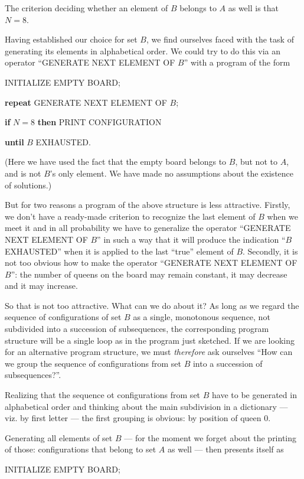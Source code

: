 The criterion deciding whether an element of $B$ belongs to $A$ as well is that $N = 8$.

Having established our choice for set $B$, we find ourselves faced with the task of generating its elements in alphabetical order. We could try to do this via an operator ``GENERATE NEXT ELEMENT OF $B$'' with a program of the form

INITIALIZE EMPTY BOARD;

\textbf{\textbf{repeat}} GENERATE NEXT ELEMENT OF $B$;

\quad \textbf{if} $N = 8$ \textbf{then} PRINT CONFIGURATION

\textbf{until} $B$ EXHAUSTED.

\noindent
(Here we have used the fact that the empty board belongs to $B$, but not to $A$, and is not $B$'s only element. We have made no assumptions about the existence of solutions.)

But for two reasons a program of the above structure is less attractive. Firstly, we don't have a ready-made criterion to recognize the last element of $B$ when we meet it and in all probability we have to generalize the operator ``GENERATE NEXT ELEMENT OF $B$'' in such a way that it will produce the indication ``$B$ EXHAUSTED'' when it is applied to the last ``true'' element of $B$. Secondly, it is not too obvious how to make the operator ``GENERATE NEXT ELEMENT OF $B$'': the number of queens on the board may remain constant, it may decrease and it may increase.

So that is not too attractive. What can we do about it? As long as we regard the sequence of configurations of set $B$ as a single, monotonous sequence, not subdivided into a succession of subsequences, the corresponding program structure will be a single loop as in the program just sketched. If we are looking for an alternative program structure, we must \textit{therefore} ask ourselves ``How can we group the sequence of configurations from set $B$ into a succession of subsequences?''.

Realizing that the sequence ot configurations from set $B$ have to be generated in alphabetical order and thinking about the main subdivision in a dictionary --- viz. by first letter --- the first grouping is obvious: by position of queen 0.

Generating all elements of set $B$ --- for the moment we forget about the printing of those: configurations that belong to set $A$ as well --- then presents itself as

INITIALIZE EMPTY BOARD;

